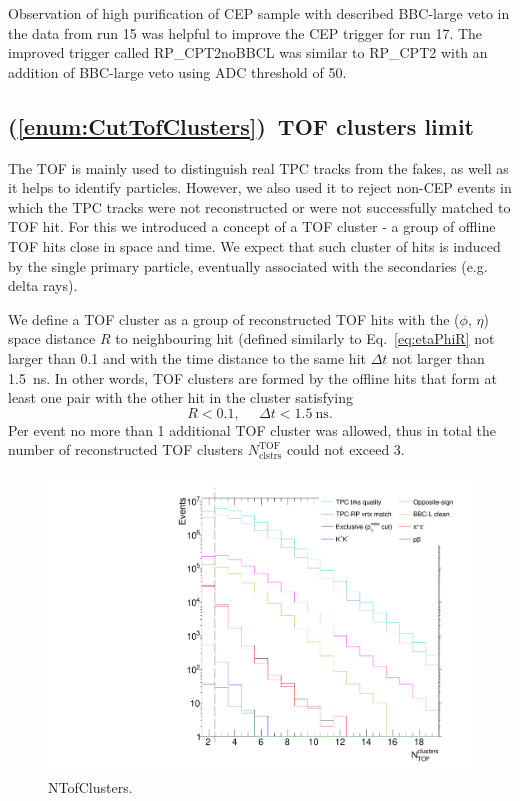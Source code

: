 Observation of high purification of CEP sample with described BBC-large veto in the data from run 15 was helpful to improve the CEP trigger for run 17. The improved trigger called RP\_CPT2noBBCL was similar to RP\_CPT2 with an addition of BBC-large veto using ADC threshold of 50.




\subsection{(\ref{enum:CutTofClusters})~TOF clusters limit}\label{sec:C7}

The TOF is mainly used to distinguish real TPC tracks from the fakes, as well as it helps to identify particles. However, we also used it to reject non-CEP events in which the TPC tracks were not reconstructed or were not successfully matched to TOF hit. For this we introduced a concept of a TOF cluster - a group of offline TOF hits close in space and time. We expect that such cluster of hits is induced by the single primary particle, eventually associated with the secondaries (e.g. delta rays).

We define a TOF cluster as a group of reconstructed TOF hits with the ($\phi$, $\eta$) space distance $R$ to neighbouring hit (defined similarly to Eq.~\eqref{eq:etaPhiR} not larger than 0.1 and with the time distance to the same hit $\Delta t$ not larger than 1.5~ns. In other words, TOF clusters are formed by the offline hits that form at least one pair with the other hit in the cluster satisfying
\begin{equation}
 R<0.1,~~~~~~\Delta t<1.5~\text{ns}.
\end{equation}
Per event no more than 1 additional TOF cluster was allowed, thus in total the number of reconstructed TOF clusters $N^{\text{TOF}}_{\text{clstrs}}$ could not exceed 3.

\begin{figure}[ht!]
\centering%
\includegraphics[width=0.475\linewidth,page=1]{graphics/eventSelection/NTofClusters.pdf}%
\caption{NTofClusters.}\label{fig:NTofClusters}%
\end{figure}


